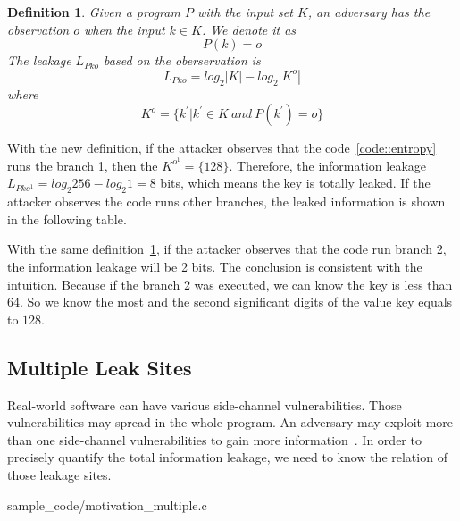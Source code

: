 \newtheorem{mydef}{Definition}

\begin{mydef}
\label{def}
Given a program $P$ with the input set $K$, 
an adversary has the observation $o$ when the input $k{\in}K$. 
We denote it as
    $$P(k) = o$$
The leakage $L_{Pko}$ based on the oberservation is
    $$L_{Pko} = log_2{|K|} - log_2{|K^o|}$$
    where
    $$K^o = \{k^{'} | k^{'}{\in}K \ and \ P(k^{'}) = o \}$$
\end{mydef}

With the new definition, if the attacker observes that the code~\ref{code::entropy} runs the branch 1, 
then the $K^{o^{1}} = \{128\}$. Therefore, the information leakage $L_{Pko^{1}} = log_2{256} - log_2{1} = 8$
bits, which means the key is totally leaked. If the attacker observes the code runs other
branches, the leaked information is shown in the following table.

\begin{table}[h]
    \centering
    \caption{The leaked information by the definition~\ref{def}}
\end{table}

With the same definition~\ref{def}, if the attacker observes that the code run branch 2, the information
leakage will be 2 bits. The conclusion is consistent with the intuition. Because if the branch 2 was
executed, we can know the key is less than 64. So we know the most and the second significant digits of 
the value key equals to $128$.

\subsection{Multiple Leak Sites}
Real-world software can have various side-channel vulnerabilities. Those vulnerabilities 
may spread in the whole program. An adversary may exploit more than one side-channel vulnerabilities 
to gain more information~\cite{7163052, 191010}. In order to precisely quantify the
total information leakage, we need to know the relation of those leakage sites. 



                 {sample_code/motivation_multiple.c}

